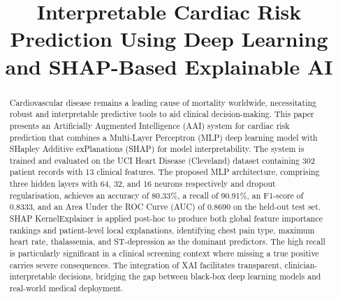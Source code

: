 \documentclass[conference]{IEEEtran}
\begin{document}
\title{Interpretable Cardiac Risk Prediction Using Deep Learning and SHAP-Based Explainable AI}

\author{
  \and
  \and
}

\maketitle

\begin{abstract}
Cardiovascular disease remains a leading cause of mortality worldwide, necessitating robust and interpretable predictive tools to aid clinical decision-making. This paper presents an Artificially Augmented Intelligence (AAI) system for cardiac risk prediction that combines a Multi-Layer Perceptron (MLP) deep learning model with SHapley Additive exPlanations (SHAP) for model interpretability. The system is trained and evaluated on the UCI Heart Disease (Cleveland) dataset containing 302 patient records with 13 clinical features. The proposed MLP architecture, comprising three hidden layers with 64, 32, and 16 neurons respectively and dropout regularisation, achieves an accuracy of 80.33\%, a recall of 90.91\%, an F1-score of 0.8333, and an Area Under the ROC Curve (AUC) of 0.8690 on the held-out test set. SHAP KernelExplainer is applied post-hoc to produce both global feature importance rankings and patient-level local explanations, identifying chest pain type, maximum heart rate, thalassemia, and ST-depression as the dominant predictors. The high recall is particularly significant in a clinical screening context where missing a true positive carries severe consequences. The integration of XAI facilitates transparent, clinician-interpretable decisions, bridging the gap between black-box deep learning models and real-world medical deployment.
\end{abstract}
\end{document}
